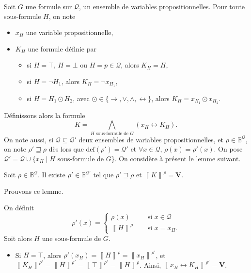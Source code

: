 \begin{prv}
	Soit $G$\/ une formule sur $\mathcal{Q}$, un ensemble de variables propositionnelles. Pour toute sous-formule $H$, on note 
	\begin{itemize}
		\item $x_H$\/ une variable propositionnelle,
		\item $K_H$\/ une formule définie par
			\begin{itemize}
				\item si $H = \top$, $H = \bot$ ou $H = p \in \mathcal{Q}$, alors $K_H = H$,
				\item si $H = \lnot H_1$, alors $K_H = \lnot x_{H_1}$,
				\item si $H = H_1 \odot H_2$, avec $\odot \in \{{\to},{\lor},{\land},{\leftrightarrow}\}$, alors $K_H = x_{H_1} \odot x_{H_2}$.
			\end{itemize}
	\end{itemize}
	Définissons alors la formule \[
		K = \bigwedge_{H \text{ sous-formule de } G} (x_H \leftrightarrow K_H)
	.\]
	On note aussi, si $\mathcal{Q} \subseteq \mathcal{Q}'$\/ deux ensembles de variables propositionnelles, et $\rho \in \mathds{B}^\mathcal{Q}$, on note $\rho' \sqsupseteq \rho$\/ dès lors que $\mathrm{def}(\rho') = \mathcal{Q}'$\/ et $\forall x \in \mathcal{Q}$, $\rho(x) = \rho'(x)$.
	On pose $\mathcal{Q}' = \mathcal{Q} \cup \{x_H  \mid H \text{ sous-formule de } G \}$.
	On considère à présent le lemme suivant.
	\begin{lem}
		Soit $\rho \in \mathds{B}^\mathcal{Q}$. Il existe $\rho' \in \mathds{B}^{\mathcal{Q}'}$\/ tel que $\rho' \sqsupseteq \rho$\/ et $\left\llbracket K \right\rrbracket^\rho = \mathbf{V}$.
	\end{lem}
	\noindent Prouvons ce lemme.
	\begin{prvk}
		On définit \[
			\rho'(x) = \begin{cases}
				\rho(x) &\quad \text{ si } x \in \mathcal{Q}\\
				\left\llbracket H \right\rrbracket^\rho &\quad \text{ si } x = x_H.
			\end{cases}
		\]
		Soit alors $H$\/ une sous-formule de $G$.
		\begin{itemize}
			\item Si $H = \top $, alors $\rho'(x_H) = \left\llbracket H \right\rrbracket^\rho = \left\llbracket x_H \right\rrbracket^{\rho'}$, et $\left\llbracket K_H \right\rrbracket^{\rho'} = \left\llbracket H \right\rrbracket^{\rho'} = \left\llbracket \top \right\rrbracket^{\rho'} = \left\llbracket H \right\rrbracket^{\rho}$. Ainsi, $\left\llbracket x_H \leftrightarrow K_H \right\rrbracket^{\rho'} = \mathbf{V}$.

\end{itemize}
\end{prvk}
\end{prv}
